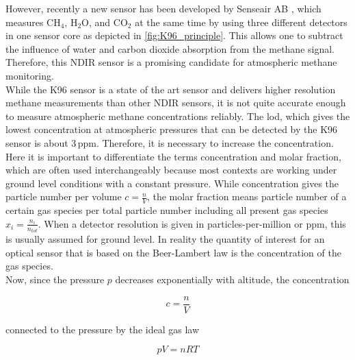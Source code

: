 However, recently a new sensor has been developed by Senseair AB \cite{wastine2022}, which measures $\mathrm{CH_4}$, $\mathrm{H_2 O}$, and $\mathrm{CO_2}$ at the same time by using three different detectors in one sensor core as depicted in \autoref{fig:K96_principle}. This allows one to subtract the influence of water and carbon dioxide absorption from the methane signal. Therefore, this NDIR sensor is a promising candidate for atmospheric methane monitoring. \\  
While the K96 sensor is a state of the art sensor and delivers higher resolution methane measurements than other NDIR sensors, it is not quite accurate enough to measure atmospheric methane concentrations reliably. The \gls{lod}, which gives the lowest concentration at atmospheric pressures that can be detected by the K96 sensor is about 3\,ppm\cite{mao_improvement_2025}. Therefore, it is necessary to increase the concentration. Here it is important to differentiate the terms concentration and molar fraction, which are often used interchangeably because most contexts are working under ground level conditions with a constant pressure. While concentration gives the particle number per volume $c=\frac{n}{V}$, the molar fraction means particle number of a certain gas species per total particle number including all present gas species $x_i=\frac{n_i}{n_{tot}}$. When a detector resolution is given in particles-per-million or ppm, this is usually assumed for ground level. In reality the quantity of interest for an optical sensor that is based on the Beer-Lambert law is the concentration of the gas species.\\ 
Now, since the pressure $p$ decreases exponentially with altitude, the concentration

\begin{equation}
c = \frac{n}{V}
\end{equation}

connected to the pressure by the ideal gas law

\begin{equation}
pV = nRT
\end{equation}

